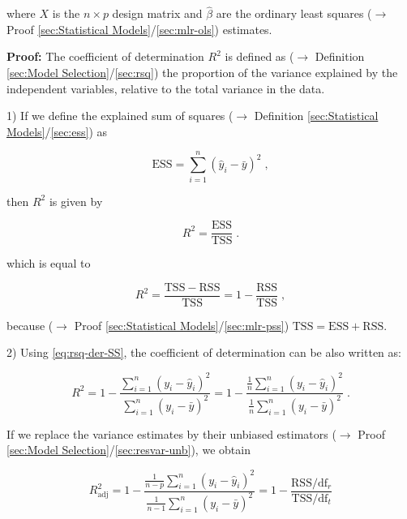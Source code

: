 \documentclass[a4paper,12pt,twoside]{book}
\begin{document}
where $X$ is the $n \times p$ design matrix and $\hat{\beta}$ are the ordinary least squares ($\rightarrow$ Proof \ref{sec:Statistical Models}/\ref{sec:mlr-ols}) estimates.


\vspace{1em}
\textbf{Proof:} The coefficient of determination $R^2$ is defined as ($\rightarrow$ Definition \ref{sec:Model Selection}/\ref{sec:rsq}) the proportion of the variance explained by the independent variables, relative to the total variance in the data.

\vspace{1em}
1) If we define the explained sum of squares ($\rightarrow$ Definition \ref{sec:Statistical Models}/\ref{sec:ess}) as

\begin{equation} \label{eq:rsq-der-ESS}
\mathrm{ESS} = \sum_{i=1}^{n} (\hat{y}_i - \bar{y})^2 \; ,
\end{equation}

then $R^2$ is given by

\begin{equation} \label{eq:rsq-der-R2-s1}
R^2 = \frac{\mathrm{ESS}}{\mathrm{TSS}} \; .
\end{equation}

which is equal to

\begin{equation} \label{eq:rsq-der-R2-s2}
R^2 = \frac{\mathrm{TSS}-\mathrm{RSS}}{\mathrm{TSS}} = 1 - \frac{\mathrm{RSS}}{\mathrm{TSS}} \; ,
\end{equation}

because ($\rightarrow$ Proof \ref{sec:Statistical Models}/\ref{sec:mlr-pss}) $\mathrm{TSS} = \mathrm{ESS} + \mathrm{RSS}$.

\vspace{1em}
2) Using \eqref{eq:rsq-der-SS}, the coefficient of determination can be also written as:

\begin{equation} \label{eq:rsq-der-R2'}
R^2 = 1 - \frac{\sum_{i=1}^{n} (y_i - \hat{y}_i)^2}{\sum_{i=1}^{n} (y_i - \bar{y})^2} = 1 - \frac{\frac{1}{n} \sum_{i=1}^{n} (y_i - \hat{y}_i)^2}{\frac{1}{n} \sum_{i=1}^{n} (y_i - \bar{y})^2} \; .
\end{equation}

If we replace the variance estimates by their unbiased estimators ($\rightarrow$ Proof \ref{sec:Model Selection}/\ref{sec:resvar-unb}), we obtain

\begin{equation} \label{eq:rsq-der-R2-adj'}
R^2_{\mathrm{adj}} = 1 - \frac{\frac{1}{n-p} \sum_{i=1}^{n} (y_i - \hat{y}_i)^2}{\frac{1}{n-1} \sum_{i=1}^{n} (y_i - \bar{y})^2} = 1 - \frac{\mathrm{RSS}/\mathrm{df}_r}{\mathrm{TSS}/\mathrm{df}_t}
\end{equation}
\end{document}
